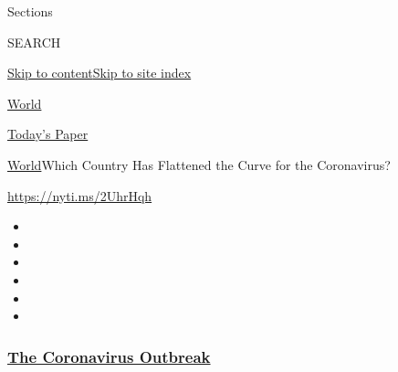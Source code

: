 Sections

SEARCH

\protect\hyperlink{site-content}{Skip to
content}\protect\hyperlink{site-index}{Skip to site index}

\href{https://www.nytimes3xbfgragh.onion/section/world}{World}

\href{https://myaccount.nytimes3xbfgragh.onion/auth/login?response_type=cookie\&client_id=vi}{}

\href{https://www.nytimes3xbfgragh.onion/section/todayspaper}{Today's
Paper}

\href{/section/world}{World}\textbar{}Which Country Has Flattened the
Curve for the Coronavirus?

\url{https://nyti.ms/2UhrHqh}

\begin{itemize}
\item
\item
\item
\item
\item
\item
\end{itemize}

\hypertarget{the-coronavirus-outbreak}{%
\subsubsection{\texorpdfstring{\href{https://www.nytimes3xbfgragh.onion/news-event/coronavirus?name=styln-coronavirus-national\&region=TOP_BANNER\&block=storyline_menu_recirc\&action=click\&pgtype=Interactive\&impression_id=9764d220-f2b9-11ea-ac98-bf5e4fe32bbf\&variant=undefined}{The
Coronavirus
Outbreak}}{The Coronavirus Outbreak}}\label{the-coronavirus-outbreak}}

